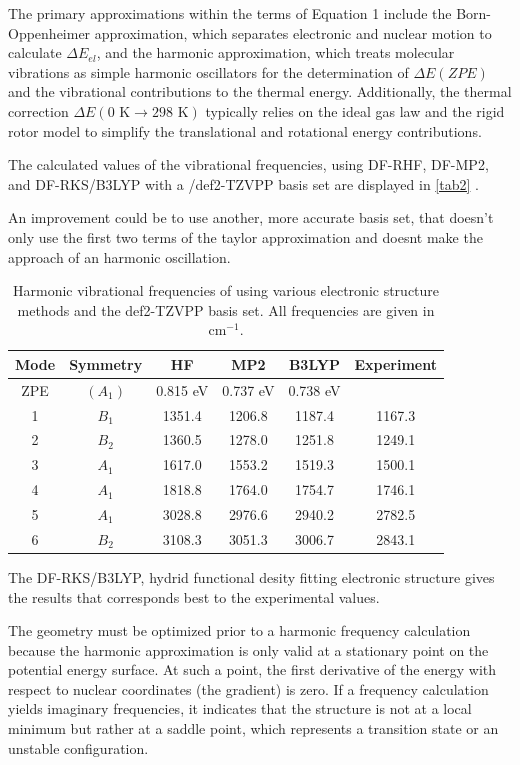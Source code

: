 \documentclass[a4paper,12pt]{scrartcl}
\begin{document}
The primary approximations within the terms of Equation 1 include the Born-Oppenheimer approximation, which separates electronic and nuclear motion to calculate $\Delta E_{el}$, and the harmonic approximation, which treats molecular vibrations as simple harmonic oscillators for the determination of $\Delta E(ZPE)$ and the vibrational contributions to the thermal energy. Additionally, the thermal correction $\Delta E(0 \text{ K} \rightarrow 298 \text{ K})$ typically relies on the ideal gas law and the rigid rotor model to simplify the translational and rotational energy contributions.

The calculated values of the vibrational frequencies, using DF-RHF, DF-MP2, and DF-RKS/B3LYP with a /def2-TZVPP basis set are displayed in \autoref{tab2} .

\begin{table}[H]
\centering
\caption{Harmonic vibrational frequencies of  using various electronic structure methods and the def2-TZVPP basis set. All frequencies are given in $\text{cm}^{-1}$.} An improvement could be to use another, more accurate basis set, that doesn't only use the first two terms of the taylor approximation and doesnt make the approach of an harmonic oscillation.

\label{tab2}
\begin{tabular}{cccccc}
\toprule
Mode & Symmetry & HF & MP2 & B3LYP & Experiment \\ \midrule
ZPE & $(A_1)$ & 0.815 eV & 0.737 eV & 0.738 eV & \\ \midrule
1 & $B_1$ & 1351.4 & 1206.8 & 1187.4 & 1167.3 \\
2 & $B_2$ & 1360.5 & 1278.0 & 1251.8 & 1249.1 \\
3 & $A_1$ & 1617.0 & 1553.2 & 1519.3 & 1500.1 \\
4 & $A_1$ & 1818.8 & 1764.0 & 1754.7 & 1746.1 \\
5 & $A_1$ & 3028.8 & 2976.6 & 2940.2 & 2782.5 \\
6 & $B_2$ & 3108.3 & 3051.3 & 3006.7 & 2843.1 \\ \bottomrule
\end{tabular}
\end{table}

The DF-RKS/B3LYP, hydrid functional desity fitting electronic structure gives the results that corresponds best to the experimental values.

The geometry must be optimized prior to a harmonic frequency calculation because the harmonic approximation is only valid at a stationary point on the potential energy surface. At such a point, the first derivative of the energy with respect to nuclear coordinates (the gradient) is zero. If a frequency calculation yields imaginary frequencies, it indicates that the structure is not at a local minimum but rather at a saddle point, which represents a transition state or an unstable configuration.
\end{document}
